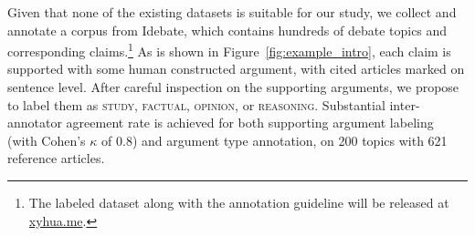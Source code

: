 Given that none of the existing datasets is suitable for our study, we collect and annotate a corpus from Idebate, which contains hundreds of debate topics and corresponding claims.\footnote{The labeled dataset along with the annotation guideline will be released at \url{xyhua.me}.} 
%
As is shown in Figure~\ref{fig:example_intro}, each claim is supported with some human constructed argument, with cited articles marked on sentence level. 
%
After careful inspection on the supporting arguments, we propose to label them as \textsc{study}, \textsc{factual}, \textsc{opinion}, or \textsc{reasoning}. Substantial inter-annotator agreement rate is achieved for both supporting argument labeling (with Cohen's $\kappa$ of 0.8) and argument type annotation, on 200 topics with 621 reference articles.


